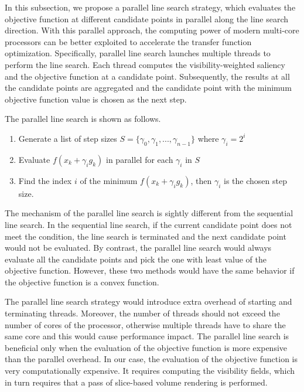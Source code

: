 In this subsection, we propose a parallel line search strategy, which evaluates the objective function at different candidate points in parallel along the line search direction. With this parallel approach, the computing power of modern multi-core processors can be better exploited to accelerate the transfer function optimization. Specifically, parallel line search launches multiple threads to perform the line search. Each thread computes the visibility-weighted saliency and the objective function at a candidate point. Subsequently, the results at all the candidate points are aggregated and the candidate point with the minimum objective function value is chosen as the next step.

The parallel line search is shown as follows.

\begin{enumerate}
	\item Generate a list of step sizes $ S= \{ \gamma_{0},\gamma_{1},...,\gamma_{n-1} \} $ where $ \gamma_{i}=2^{i} $
	\item Evaluate $ f(x_{k}+\gamma_{i} g_{k}) $ in parallel for each $ \gamma_{i} $ in $ S $
	\item Find the index $ i $ of the minimum $ f(x_{k}+\gamma_{i} g_{k}) $, then $ \gamma_{i} $ is the chosen step size.
\end{enumerate}

The mechanism of the parallel line search is sightly different from the sequential line search. In the sequential line search, if the current candidate point does not meet the condition, the line search is terminated and the next candidate point would not be evaluated. By contrast, the parallel line search would always evaluate all the candidate points and pick the one with least value of the objective function. However, these two methods would have the same behavior if the objective function is a convex function.

The parallel line search strategy would introduce extra overhead of starting and terminating threads. Moreover, the number of threads should not exceed the number of cores of the processor, otherwise multiple threads have to share the same core and this would cause performance impact. The parallel line search is beneficial only when the evaluation of the objective function is more expensive than the parallel overhead.
In our case, the evaluation of the objective function is very computationally expensive. It requires computing the visibility fields, which in turn requires that a pass of slice-based volume rendering is performed.

